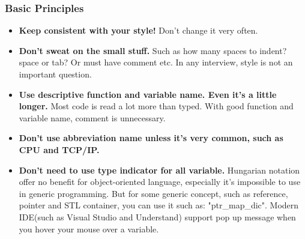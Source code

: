 \documentclass[a4paper,12pt,twoside]{book}
\begin{document}
\subsubsection{Basic Principles}
\begin{itemize}
\item \textbf{Keep consistent with your style!} Don't change it very often.

\item \textbf{Don't sweat on the small stuff.} Such as how many spaces to indent? space or tab? Or must have comment etc. In any interview, style is not an important question.

\item \textbf{Use descriptive function and variable name. Even it's a little longer.} Most code is read a lot more than typed. With good function and variable name, comment is unnecessary.

\item \textbf{Don't use abbreviation name unless it's very common, such as CPU and TCP/IP.}

\item \textbf{Don't need to use type indicator for all variable.} Hungarian notation offer no benefit for object-oriented language, especially it's impossible to use in generic programming. But for some generic concept, such as reference, pointer and STL container, you can use it such as: "ptr\_map\_dic". Modern IDE(such as Visual Studio and Understand) support pop up message when you hover your mouse over a variable.
\end{itemize}
\end{document}
